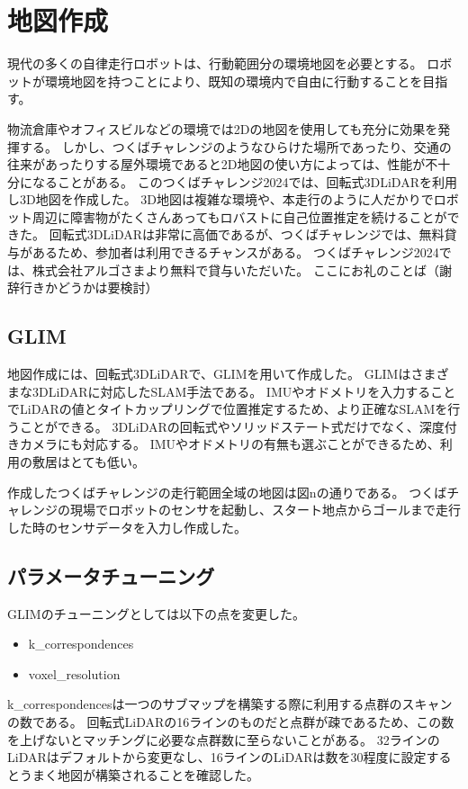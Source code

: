 \section{地図作成}
現代の多くの自律走行ロボットは、行動範囲分の環境地図を必要とする。
ロボットが環境地図を持つことにより、既知の環境内で自由に行動することを目指す。

物流倉庫やオフィスビルなどの環境では2Dの地図を使用しても充分に効果を発揮する。
しかし、つくばチャレンジのようなひらけた場所であったり、交通の往来があったりする屋外環境であると2D地図の使い方によっては、性能が不十分になることがある。
このつくばチャレンジ2024では、回転式3DLiDARを利用し3D地図を作成した。
3D地図は複雑な環境や、本走行のように人だかりでロボット周辺に障害物がたくさんあってもロバストに自己位置推定を続けることができた。
回転式3DLiDARは非常に高価であるが、つくばチャレンジでは、無料貸与があるため、参加者は利用できるチャンスがある。
つくばチャレンジ2024では、株式会社アルゴさまより無料で貸与いただいた。
ここにお礼のことば（謝辞行きかどうかは要検討）

\subsection{GLIM}
地図作成には、回転式3DLiDARで、GLIM\cite{GLIM}を用いて作成した。
GLIMはさまざまな3DLiDARに対応したSLAM手法である。
IMUやオドメトリを入力することでLiDARの値とタイトカップリングで位置推定するため、より正確なSLAMを行うことができる。
3DLiDARの回転式やソリッドステート式だけでなく、深度付きカメラにも対応する。
IMUやオドメトリの有無も選ぶことができるため、利用の敷居はとても低い。

作成したつくばチャレンジの走行範囲全域の地図は図nの通りである。
つくばチャレンジの現場でロボットのセンサを起動し、スタート地点からゴールまで走行した時のセンサデータを入力し作成した。

\subsection{パラメータチューニング}
GLIMのチューニングとしては以下の点を変更した。
\begin{itemize}
    \item k\_correspondences
    \item voxel\_resolution
\end{itemize}

k\_correspondencesは一つのサブマップを構築する際に利用する点群のスキャンの数である。
回転式LiDARの16ラインのものだと点群が疎であるため、この数を上げないとマッチングに必要な点群数に至らないことがある。
32ラインのLiDARはデフォルトから変更なし、16ラインのLiDARは数を30程度に設定するとうまく地図が構築されることを確認した。

